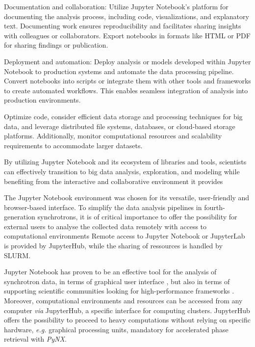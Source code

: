     Documentation and collaboration: Utilize Jupyter Notebook's platform for documenting the analysis process, including code, visualizations, and explanatory text. Documenting work ensures reproducibility and facilitates sharing insights with colleagues or collaborators. Export notebooks in formats like HTML or PDF for sharing findings or publication.

    Deployment and automation: Deploy analysis or models developed within Jupyter Notebook to production systems and automate the data processing pipeline. Convert notebooks into scripts or integrate them with other tools and frameworks to create automated workflows. This enables seamless integration of analysis into production environments.

Optimize code, consider efficient data storage and processing techniques for big data, and leverage distributed file systems, databases, or cloud-based storage platforms. Additionally, monitor computational resources and scalability requirements to accommodate larger datasets.

By utilizing Jupyter Notebook and its ecosystem of libraries and tools, scientists can effectively transition to big data analysis, exploration, and modeling while benefiting from the interactive and collaborative environment it provides


The Jupyter Notebook environment \parencite{IPython,Kluyver2016jupyter} was chosen for its versatile, user-friendly and browser-based interface.
To simplify the data analysis pipelines in fourth-generation synchrotrons, it is of critical importance to offer the possibility for external users to analyse the collected data remotely with access to computational environments
Remote access to Jupyter Notebook or JupyterLab is provided by JupyterHub, while the sharing of ressources is handled by SLURM.

Jupyter Notebook has proven to be an effective tool for the analysis of synchrotron data, in terms of graphical user interface \parencite{Martini2019a,Simonne2020}, but also in terms of supporting scientific communities looking for high-performance frameworks \parencite{jupyter_computing_4, jupyter_computing_1, jupyter_computing_3, jupyter_computing_2, 9307800}.
Moreover, computational environments and resources can be accessed from any computer \textit{via} JupyterHub, a specific interface for computing clusters.
JupyterHub offers the possibility to proceed to heavy computations without relying on specific hardware, \textit{e.g.} graphical processing units, mandatory for accelerated phase retrieval with \textit{PyNX}.


